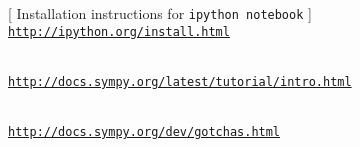 {[ Installation instructions for \texttt{ipython notebook} ] \\ 
\href{http://ipython.org/install.html}{\texttt{http://ipython.org/install.html}}

\medskip
{} \\ 
\href{http://docs.sympy.org/latest/tutorial/intro.html}{\texttt{http://docs.sympy.org/latest/tutorial/intro.html}}

\medskip
{} \\ 
\href{http://docs.sympy.org/dev/gotchas.html}{\texttt{http://docs.sympy.org/dev/gotchas.html}}



}












